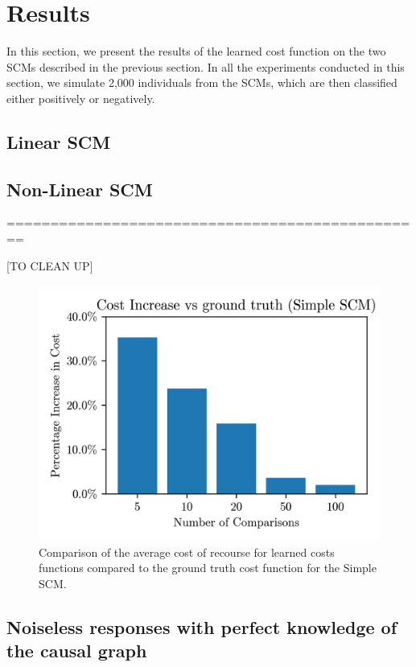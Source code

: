 \section{Results}

In this section, we present the results of the learned cost function on the two SCMs described in the previous section. In all the experiments conducted in this section, we simulate 2,000 individuals from the SCMs, which are then classified either positively or negatively.

\subsection{Linear SCM}

\subsection{Non-Linear SCM}



================================================

[TO CLEAN UP]

\begin{figure}[!htb]
	\centering
	\includegraphics[scale=1]{images/simpleSCM_comparison_results.png}
	\caption{Comparison of the average cost of recourse for learned costs functions compared to the ground truth cost function for the Simple SCM.}
	\label{fig:simple_scm}
\end{figure}


\subsection{Noiseless responses with perfect knowledge of the causal graph}

